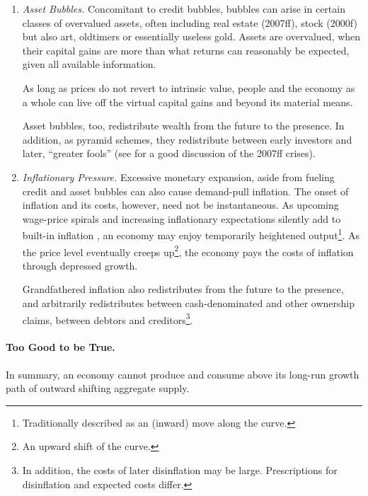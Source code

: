 \begin{enumerate}
	\item {} \label{it:assetbubbles} \emph{Asset Bubbles.} Concomitant to credit bubbles, bubbles can arise in certain classes of overvalued assets, often including real estate (2007ff), stock (2000f) but also art, oldtimers or essentially useless gold. Assets are overvalued, when their capital gains are more than what returns can reasonably be expected, given all available information. %

	As long as prices do not revert to intrinsic value, people and the economy as a whole can live off the virtual capital gains and beyond its material means. %

	Asset bubbles, too, redistribute wealth from the future to the presence. In addition, as pyramid schemes, they redistribute between early investors and later, ``greater fools'' (see \citealt{Stiglitz2010} for a good discussion of the 2007ff crises).

	\item {} \label{it:inflationarypressure} \emph{Inflationary Pressure.} Excessive monetary expansion, aside from fueling credit and asset bubbles can also cause demand-pull inflation. The onset of inflation and its costs, however, need not be instantaneous. As upcoming wage-price spirals and increasing inflationary expectations silently add to built-in inflation \citep{Gordon1988}, an economy may enjoy temporarily  heightened output\footnote{
		Traditionally described as an (inward) move along the \cite{Phillips1958} curve.}. 
	As the price level eventually creeps up\footnote{
		An upward shift of the \cite{Phillips1958} curve.}, 
	the economy pays the costs of inflation through depressed growth.

	Grandfathered inflation also redistributes from the future to the presence, and arbitrarily redistributes between cash-denominated and other ownership claims, between debtors and creditors\footnote{
		In addition, the costs of later disinflation may be large. Prescriptions for disinflation and expected costs differ.}.%
\end{enumerate}

\paragraph[Too Good To Be True]{Too Good to be True.}
In summary, an economy cannot produce and consume above its long-run growth path of outward shifting aggregate supply. 

